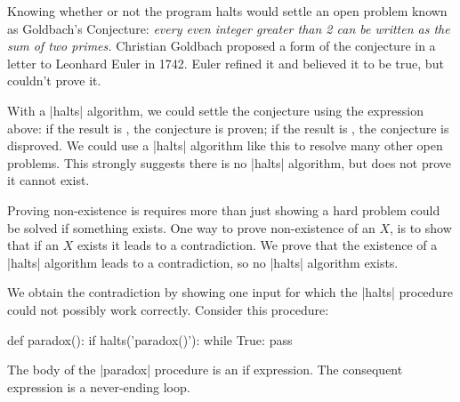 \begin{schemeregion}
Knowing whether or not the program halts would settle an open problem known as Goldbach's Conjecture: {\em every even integer greater than 2 can be written as the sum of two primes.}  Christian Goldbach proposed a form of the conjecture in a letter to Leonhard Euler in 1742.  Euler refined it and believed it to be true, but couldn't prove it.

With a \pycode|halts| algorithm, we could settle the conjecture using the expression above: if the result is \False, the conjecture is proven; if the result is \True, the conjecture is disproved.  We could use a \pycode|halts| algorithm like this to resolve many other open problems. This strongly suggests there is no \pycode|halts| algorithm, but does not prove it cannot exist.  

  Proving non-existence is requires more than just showing a hard problem could be solved if something exists.  One way to prove non-existence of an $X$, is to show that if an $X$ exists it leads to a contradiction.  We prove that the existence of a \pycode|halts| algorithm leads to a contradiction, so  no \pycode|halts| algorithm exists.  

We obtain the contradiction by showing one input for which the \pycode|halts| procedure could not possibly work correctly.  Consider this procedure:
\begin{pythoncode}
def paradox():
    if halts('paradox()'): while True: pass
\end{pythoncode}

The body of the \scheme|paradox| procedure is an if expression.  The consequent expression is a never-ending loop.  


\end{schemeregion}
